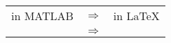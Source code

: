 \documentclass[a3paper, 10pt, landscape]{article}
\begin{document}
\begin{table}[h] \begin{tabular}{ccc}
    in MATLAB&$\Rightarrow$& in LaTeX\\
    \fbox{}&
    $\Rightarrow$&
    \fbox{}
\end{tabular}\end{table}
\end{document}
